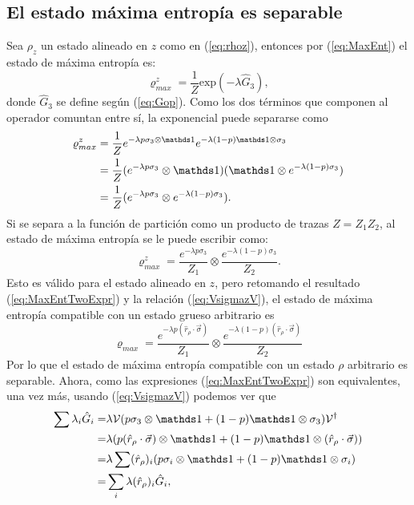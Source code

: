 \subsection{El estado máxima entropía es separable}

Sea $\rho_{z}$ un estado alineado en $z$ como en (\ref{eq:rhoz}), entonces por (\ref{eq:MaxEnt}) el estado de máxima entropía es:
\begin{equation}\label{eq:MaxEntUgly}
\varrho_{max}^{z}=\frac{1}{Z}\text{exp}(-\lambda\hat{G}_{3}),
\end{equation}
donde $\hat{G}_{3}$ se define según (\ref{eq:Gop}). Como los dos términos que componen al operador comuntan entre sí, la exponencial puede separarse como
\begin{align*}
\varrho_{max}^{z}&=\frac{1}{Z}e^{-\lambda p\sigma_{3}\otimes\Id}e^{-\lambda(1-p)\Id\otimes\sigma_{3}}\\
&=\frac{1}{Z}(e^{-\lambda p\sigma_{3}}\otimes\Id)( \Id\otimes e^{-\lambda(1-p)\sigma_{3}})\\
&=\frac{1}{Z}(e^{-\lambda p\sigma_{3}}\otimes e^{-\lambda(1-p)\sigma_{3}}).\\
\end{align*}
Si se separa a la función de partición como un producto de trazas $Z=Z_{1}Z_{2}$, al estado de máxima entropía se le puede escribir como:
\begin{equation}\label{eq:MaxEntZ}
\varrho_{max}^{z}=\frac{e^{-\lambda p\sigma_{3}}}{Z_{1}} \otimes \frac{e^{-\lambda(1-p)\sigma_{3}}}{Z_{2}}.
\end{equation}
Esto es válido para el estado alineado en $z$, pero retomando el resultado (\ref{eq:MaxEntTwoExpr}) y la relación (\ref{eq:VsigmazV}), el estado de máxima entropía compatible con un estado grueso arbitrario es
\begin{equation}\label{eq:MaxEntSeparable}
  \boxed{\varrho_{max}=\frac{e^{-\lambda p(\hat{r}_{\rho}\cdot\vec{\sigma})}}{Z_{1}} \otimes \frac{e^{-\lambda(1-p)(\hat{r}_{\rho}\cdot\vec{\sigma})}}{Z_{2}}}
\end{equation}
Por lo que el estado de máxima entropía compatible con un estado $\rho$ arbitrario es separable. Ahora, como las expresiones (\ref{eq:MaxEntTwoExpr}) son equivalentes, una vez más, usando (\ref{eq:VsigmazV}) podemos ver que
\begin{align*}
  \sum\lambda_{i}\hat{G}_{i}=&\lambda\mcV(p\sigma_{3}\otimes\Id+(1-p)\Id\otimes\sigma_{3})\mcV^{\dag}\\
  =&\lambda(p(\hat{r}_{\rho}\cdot\vec{\sigma})\otimes\Id+(1-p)\Id\otimes(\hat{r}_{\rho}\cdot\vec{\sigma}))\\
  =& \lambda\sum(\hat{r}_{\rho})_{i}(p\sigma_{i}\otimes\Id+(1-p)\Id\otimes\sigma_{i})\\
  =&\sum_{i}\lambda(\hat{r}_{\rho})_{i}\hat{G}_{i},
\end{align*}
